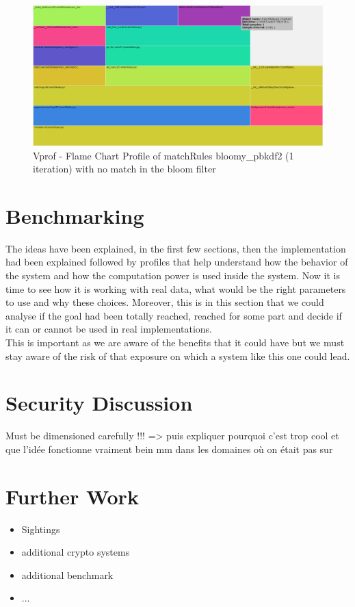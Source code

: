 \documentclass{eplmastersthesis}
\begin{document}
\begin{figure}[h!]
\begin{center}
	\includegraphics[scale=0.3]{res/match-bloom-not}
	\caption{Vprof - Flame Chart Profile of matchRules bloomy\_pbkdf2 (1 iteration) with no match in the bloom filter}
	\label{profile-bloomy-no-match}
\end{center}
\end{figure}

\section{Benchmarking}
The ideas have been explained, in the first few sections, then the implementation had been explained followed by profiles that help understand how the behavior of the system and how the computation power is used inside the system. Now it is time to see how it is working with real data, what would be the right parameters to use and why these choices. Moreover, this is in this section that we could analyse if the goal had been totally reached, reached for some part and decide if it can or cannot be used in real implementations.\\
This is important as we are aware of the benefits that it could have but we must stay aware of the risk of that exposure on which a system like this one could lead.\\


\section{Security Discussion}
Must be dimensioned carefully !!! => puis expliquer pourquoi c'est trop cool et que l'idée fonctionne vraiment bein mm dans les domaines où on était pas sur

\section{Further Work}
\begin{itemize}
\item Sightings
\item additional crypto systems
\item additional benchmark
\item ...
\end{itemize}


\newpage


\newpage

\backcoverpage
\end{document}

